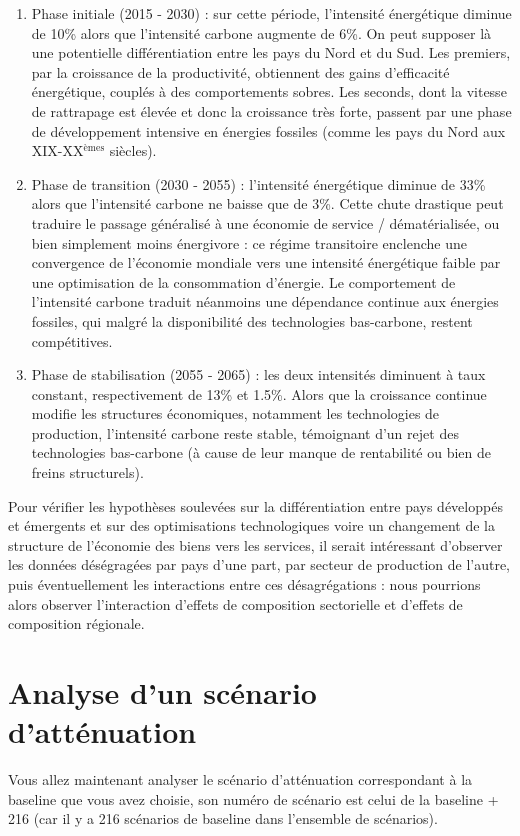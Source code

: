 \documentclass[a4,11pt]{aleph-notas}
\newcommand{\ans}[1]{
\begin{mdframed}[
    roundcorner=10pt,     %
    backgroundcolor=gray!20, %
    linecolor=black,      %
    linewidth=1pt,        %
    innertopmargin=10pt,  %
    innerbottommargin=10pt, %
    innerleftmargin=10pt,  %
    innerrightmargin=10pt  %
]
#1
\end{mdframed}
}
\begin{document}
\begin{enumerate}
    \item Phase initiale (2015 - 2030) : sur cette période, l'intensité énergétique diminue de 10\% alors que l'intensité carbone augmente de 6\%. On peut supposer là une potentielle différentiation entre les pays du Nord et du Sud. Les premiers, par la croissance de la productivité, obtiennent des gains d'efficacité énergétique, couplés à des comportements sobres. Les seconds, dont la vitesse de rattrapage est élevée et donc la croissance très forte, passent par une phase de développement intensive en énergies fossiles (comme les pays du Nord aux XIX-XX$^{\text{èmes}}$ siècles).
    \item Phase de transition (2030 - 2055) : l'intensité énergétique diminue de 33\% alors que l'intensité carbone ne baisse que de 3\%. Cette chute drastique peut traduire le passage généralisé à une économie de service / dématérialisée, ou bien simplement moins énergivore : ce régime transitoire enclenche une convergence de l'économie mondiale vers une intensité énergétique faible par une optimisation de la consommation d'énergie. Le comportement de l'intensité carbone traduit néanmoins une dépendance continue aux énergies fossiles, qui malgré la disponibilité des technologies bas-carbone, restent compétitives.
    \item Phase de stabilisation (2055 - 2065) : les deux intensités diminuent à taux constant, respectivement de 13\% et 1.5\%. Alors que la croissance continue modifie les structures économiques, notamment les technologies de production, l'intensité carbone reste stable, témoignant d'un rejet des technologies bas-carbone (à cause de leur manque de rentabilité ou bien de freins structurels).
\end{enumerate}

Pour vérifier les hypothèses soulevées sur la différentiation entre pays développés et émergents et sur des optimisations technologiques voire un changement de la structure de l'économie des biens vers les services, il serait intéressant d'observer les données déségragées par pays d'une part, par secteur de production de l'autre, puis éventuellement les interactions entre ces désagrégations : nous pourrions alors observer l'interaction d'effets de composition sectorielle et d'effets de composition régionale. 


\vspace{0.3cm}
\section{\Large{Analyse d’un scénario d’atténuation}}
\vspace{0.3cm}
\ans{Vous allez maintenant analyser le scénario d’atténuation correspondant à la baseline que vous avez choisie, son numéro de scénario est celui de la baseline + 216 (car il y a 216 scénarios de baseline dans l’ensemble de scénarios).}
\end{document}
